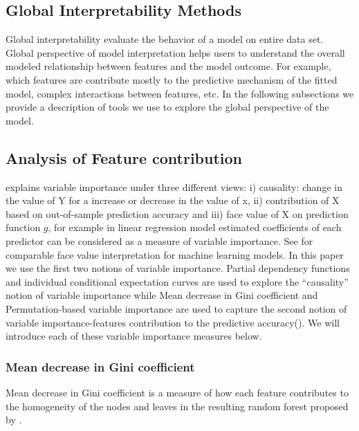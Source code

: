 \documentclass[11pt,a4paper,]{article}
\theoremstyle{definition}
\theoremstyle{definition}
\theoremstyle{definition}
\theoremstyle{remark}
\begin{document}
\subsection{Global Interpretability
Methods}\label{global-interpretability-methods}

Global interpretability evaluate the behavior of a model on entire data
set. Global perspective of model interpretation helps users to
understand the overall modeled relationship between features and the
model outcome. For example, which features are contribute mostly to the
predictive mechanism of the fitted model, complex interactions between
features, etc. In the following subsections we provide a description of
tools we use to explore the global perspective of the model.

\subsection{Analysis of Feature
contribution}\label{analysis-of-feature-contribution}

\textcite{jiang2002} explains variable importance under three different
views: i) causality: change in the value of Y for a increase or decrease
in the value of x, ii) contribution of X based on out-of-sample
prediction accuracy and iii) face value of X on prediction function
\(g\), for example in linear regression model estimated coefficients of
each predictor can be considered as a measure of variable importance.
See \textcite{jiang2002} for comparable face value interpretation for
machine learning models. In this paper we use the first two notions of
variable importance. Partial dependency functions and individual
conditional expectation curves are used to explore the ``causality''
notion of variable importance while Mean decrease in Gini coefficient
and Permutation-based variable importance are used to capture the second
notion of variable importance-features contribution to the predictive
accuracy(\textcite{Zhao}). We will introduce each of these variable
importance measures below.

\subsubsection{Mean decrease in Gini
coefficient}\label{mean-decrease-in-gini-coefficient}

Mean decrease in Gini coefficient is a measure of how each feature
contributes to the homogeneity of the nodes and leaves in the resulting
random forest proposed by \textcite{breiman2001random}.
\end{document}
